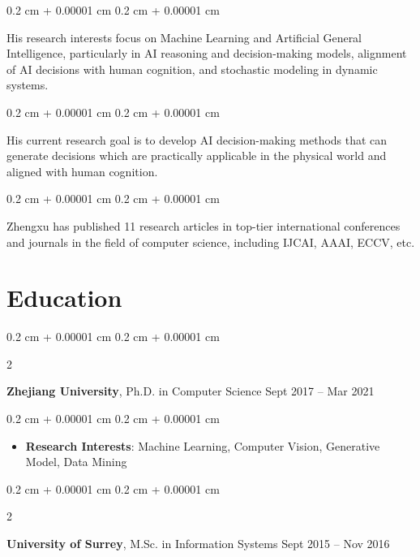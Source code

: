 \documentclass[10pt, letterpaper]{article}
\newenvironment{highlights}{
    \begin{itemize}[
        topsep=0.10 cm,
        parsep=0.10 cm,
        partopsep=0pt,
        itemsep=0pt,
        leftmargin=0.4 cm + 10pt
    ]
}{
    \end{itemize}
} %
\newenvironment{onecolentry}{
    \begin{adjustwidth}{
        0.2 cm + 0.00001 cm
    }{
        0.2 cm + 0.00001 cm
    }
}{
    \end{adjustwidth}
} %
\newenvironment{twocolentry}[2][]{
    \onecolentry
    \def\secondColumn{#2}
    \setcolumnwidth{\fill, 4.5 cm}
    \begin{paracol}{2}
}{
    \switchcolumn \raggedleft \secondColumn
    \end{paracol}
    \endonecolentry
} %
\begin{document}
        \begin{onecolentry}
            His research interests focus on Machine Learning and Artificial General Intelligence, particularly in AI reasoning and decision-making models, alignment of AI decisions with human cognition, and stochastic modeling in dynamic systems.
        \end{onecolentry}

        \vspace{0.2 cm}

        \begin{onecolentry}
            His current research goal is to develop AI decision-making methods that can generate decisions which are practically applicable in the physical world and aligned with human cognition.
        \end{onecolentry}

        \vspace{0.2 cm}

        \begin{onecolentry}
            Zhengxu has published 11 research articles in top-tier international conferences and journals in the field of computer science, including IJCAI, AAAI, ECCV, etc.
        \end{onecolentry}


    
    \section{Education}



        
        \begin{twocolentry}{
            Sept 2017 – Mar 2021
        }
            \textbf{Zhejiang University}, Ph.D. in Computer Science\end{twocolentry}

        \vspace{0.10 cm}
        \begin{onecolentry}
            \begin{highlights}
                \item \textbf{Research Interests}: Machine Learning, Computer Vision, Generative Model, Data Mining
            \end{highlights}
        \end{onecolentry}


        \vspace{0.2 cm}

        \begin{twocolentry}{
            Sept 2015 – Nov 2016
        }
            \textbf{University of Surrey}, M.Sc. in Information Systems\end{twocolentry}
\end{document}

